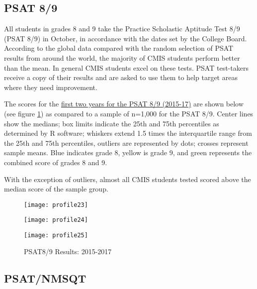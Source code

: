 \subsection{PSAT 8/9}

All students in grades 8 and 9 take the Practice Scholastic Aptitude Test 8/9 (PSAT 8/9) in October, in accordance with the dates set by the College Board. According to the global data compared with the random selection of PSAT results from around the world, the majority of CMIS students perform better than the mean. In general CMIS students excel on these tests.   PSAT test-takers receive a copy of their results and are asked to use them to help target areas where they need improvement.  

The scores for the \href{https://docs.google.com/a/cmis.ac.th/spreadsheets/d/1OVMnw4x1eUg-QByMt2J2IZJkovZGys_8uoj1SKSM2As/edit?usp=sharing}{ first two years for the PSAT 8/9 (2015-17)} are shown below (see figure \ref{figure:PSATData}) as compared to a sample of n=1,000 for the PSAT 8/9.  Center lines show the medians; box limits indicate the 25th and 75th percentiles as determined by R software; whiskers extend 1.5 times the interquartile range from the 25th and 75th percentiles, outliers are represented by dots; crosses represent sample means. Blue indicates grade 8, yellow is grade 9, and green represents the combined score of grades 8 and 9.  

With the exception of outliers, almost all CMIS students tested scored above the median score of the sample group.  

\begin{figure}[H]
\caption{PSAT8/9 Results: 2015-2017}
\label{figure:PSATData}
\begin{minipage}{0.5\textwidth}
\texttt{[image: profile23]}
\end{minipage}%
\begin{minipage}{0.5\textwidth}
\texttt{[image: profile24]}
\end{minipage}
\begin{minipage}{0.5\textwidth}
\texttt{[image: profile25]}
\end{minipage}
\end{figure}

\subsection{PSAT/NMSQT}

